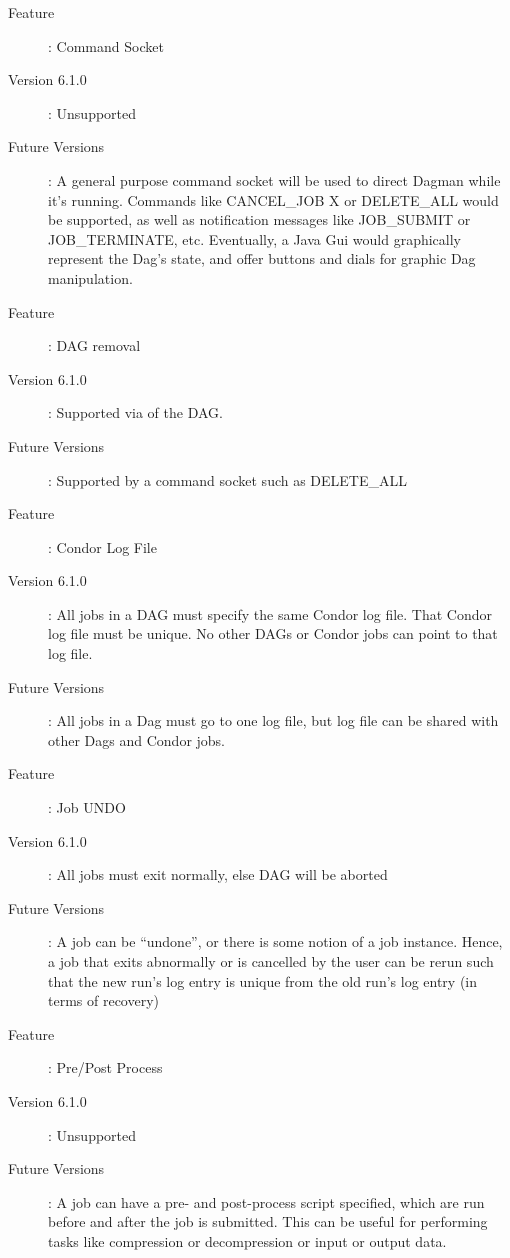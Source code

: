 \begin{description}
\item[Feature] : Command Socket
\item[Version 6.1.0] : Unsupported
\item[Future Versions] : A general purpose command socket will be used to
direct Dagman while it's running.  Commands like CANCEL\_JOB X or DELETE\_ALL
would be supported, as well as notification messages like JOB\_SUBMIT or
JOB\_TERMINATE, etc.  Eventually, a Java Gui would graphically represent the
Dag's state, and offer buttons and dials for graphic Dag manipulation.
\end{description}

\begin{description}
\item[Feature]: DAG removal
\item[Version 6.1.0]: Supported via  of the DAG.
\item[Future Versions]: Supported by a command socket such as DELETE\_ALL
\end{description}

\begin{description}
\item[Feature]: Condor Log File
\item[Version 6.1.0]: All jobs in a DAG must specify the same Condor log file.
That Condor log file must be unique.  No other DAGs or Condor jobs can point
to that log file.
\item[Future Versions]: All jobs in a Dag must go to one log file, but
log file can be shared with other Dags and Condor jobs.
\end{description}

\begin{description}
\item[Feature]: Job UNDO
\item[Version 6.1.0]: All jobs must exit normally, else DAG will be aborted
\item[Future Versions]: A job can be ``undone'', or there is some
notion of a job instance.  Hence, a job that exits abnormally or is
cancelled by the user can be rerun such that the new run's log entry
is unique from the old run's log entry (in terms of recovery)
\end{description}

\begin{description}
\item[Feature]: Pre/Post Process
\item[Version 6.1.0]: Unsupported
\item[Future Versions]: A job can have a pre- and post-process script
specified, which are run before and after the job is submitted.  This can be
useful for performing tasks like compression or decompression or input or
output data.
\end{description}
